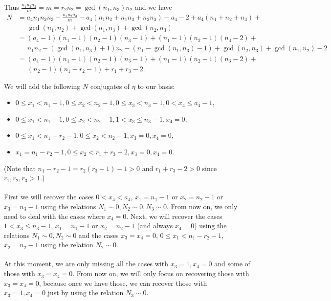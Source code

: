 \documentclass[12pt,a4paper]{article}
\theoremstyle{definition}
\begin{document}
Thus $\frac{n_1n_2n_3}{m}=m=r_2n_2=\gcd(n_1,n_3)n_2$ and we have
\begin{align*}
N&=a_4n_1n_2n_3-\frac{n_1n_2n_3}{m}-a_4(n_1n_2+n_1n_3+n_2n_3)-a_4-2+a_4(n_1+n_2+n_3)+\\
&\phantom{am}\gcd(n_1,n_2)+\gcd(n_1,n_3)+\gcd(n_2,n_3)\\
&=(a_4-1)(n_1-1)(n_2-1)(n_3-1)+(n_1-1)(n_2-1)(n_3-2)+\\
&\phantom{am}n_1n_2-(\gcd(n_1,n_3)+1)n_2-(n_1-\gcd(n_1,n_3)-1)+\gcd(n_2,n_3)+\gcd(n_1,n_2)-2\\
&=(a_4-1)(n_1-1)(n_2-1)(n_3-1)+(n_1-1)(n_2-1)(n_3-2)+\\
&\phantom{am}(n_2-1)(n_1-r_2-1)+r_1+r_3-2.
\end{align*}

We will add the following $N$ conjugates of $\eta$ to our basis:
\begin{itemize}
\item $0\leq x_1<n_1-1, 0\leq x_2<n_2-1, 0\leq x_3<n_3-1, 0<x_4\leq a_4-1$,
\item $0\leq x_1<n_1-1, 0\leq x_2<n_2-1, 1< x_3 \leq n_3-1, x_4=0$,
\item $0\leq x_1< n_1-r_2-1, 0\leq x_2<n_2-1, x_3=0, x_4=0$,
\item           $x_1=n_1-r_2-1, 0\leq x_2<r_1+r_3-2, x_3=0, x_4=0$.
\end{itemize}
(Note that $n_1-r_2-1=r_2(r_3-1)-1> 0$ and $r_1+r_3-2>0$ since $r_1,r_2,r_3>1$.)

\paragraph*{}
First we will recover the cases $0<x_4<a_4$, $x_1=n_1-1$ or $x_2=n_2-1$ or $x_3=n_3-1$ using the relations $N_1\sim 0, N_2\sim 0, N_3\sim 0$. From now on, we only need to deal with the cases where $x_4=0$. Next, we will recover the cases $1< x_3 \leq n_3-1$, $x_1=n_1-1$ or $x_2=n_2-1$ (and always $x_4=0$) using the relations $N_1\sim 0, N_2\sim 0$ and the cases $x_3=x_4=0$, $0\leq x_1< n_1-r_2-1$, $x_2=n_2-1$ using the relation $N_2\sim 0$.
\paragraph*{}
At this moment, we are only missing all the cases with $x_3=1,x_4=0$ and some of those with $x_3=x_4=0$. From now on, we will only focus on recovering those with $x_3=x_4=0$, because once we have those, we can recover those with $x_3=1,x_4=0$ just by using the relation $N_3\sim 0$.
\end{document}
